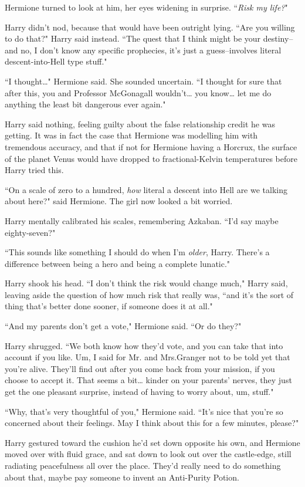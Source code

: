 Hermione turned to look at him, her eyes widening in surprise. ``\emph{Risk my life?}"

Harry didn't nod, because that would have been outright lying. ``Are you willing to do that?" Harry said instead. ``The quest that I think might be your destiny\---and no, I don't know any specific prophecies, it's just a guess\---involves literal descent-into-Hell type stuff."

``I thought{\ldots}" Hermione said. She sounded uncertain. ``I thought for sure that after this, you and Professor McGonagall wouldn't{\ldots} you know{\ldots} let me do anything the least bit dangerous ever again."

Harry said nothing, feeling guilty about the false relationship credit he was getting. It was in fact the case that Hermione was modelling him with tremendous accuracy, and that if not for Hermione having a Horcrux, the surface of the planet Venus would have dropped to fractional-Kelvin temperatures before Harry tried this.

``On a scale of zero to a hundred, \emph{how} literal a descent into Hell are we talking about here?" said Hermione. The girl now looked a bit worried.

Harry mentally calibrated his scales, remembering Azkaban. ``I'd say maybe eighty-seven?"

``This sounds like something I should do when I'm \emph{older}, Harry. There's a difference between being a hero and being a complete lunatic."

Harry shook his head. ``I don't think the risk would change much," Harry said, leaving aside the question of how much risk that really was, ``and it's the sort of thing that's better done sooner, if someone does it at all."

``And my parents don't get a vote," Hermione said. ``Or do they?"

Harry shrugged. ``We both know how they'd vote, and you can take that into account if you like. Um, I said for Mr. and Mrs.\?Granger not to be told yet that you're alive. They'll find out after you come back from your mission, if you choose to accept it. That seems a bit{\ldots} kinder on your parents' nerves, they just get the one pleasant surprise, instead of having to worry about, um, stuff."

``Why, that's very thoughtful of you," Hermione said. ``It's nice that you're so concerned about their feelings. May I think about this for a few minutes, please?"

Harry gestured toward the cushion he'd set down opposite his own, and Hermione moved over with fluid grace, and sat down to look out over the castle-edge, still radiating peacefulness all over the place. They'd really need to do something about that, maybe pay someone to invent an Anti-Purity Potion.

